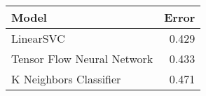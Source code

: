 \begin{tabular}{lr}
\toprule
                     Model &  Error \\
\midrule
                 LinearSVC &  0.429 \\
Tensor Flow Neural Network &  0.433 \\
    K Neighbors Classifier &  0.471 \\
\bottomrule
\end{tabular}
